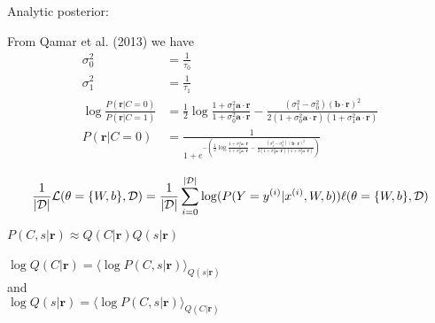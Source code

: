 \documentclass[12pt]{article}
\begin{document}
Analytic posterior:

From Qamar et al. (2013) we have
\begin{equation}
\begin{aligned}
\sigma_0^2 &= \frac{1}{\tau_0}\\
\sigma_1^2 &= \frac{1}{\tau_1}\\
\log \frac{P(\mathbf{r}|C = 0)}{P(\mathbf{r}|C = 1)} &= \frac{1}{2} \log \frac{1 + \sigma_1^2 \mathbf{a} \cdot \mathbf{r}}{1 + \sigma_0^2\mathbf{a} \cdot \mathbf{r}} - \frac{(\sigma_1^2 - \sigma_0^2)(\mathbf{b} \cdot \mathbf{r})^2}{2 (1 + \sigma_0^2 \mathbf{a} \cdot \mathbf{r})(1 + \sigma_1^2 \mathbf{a} \cdot \mathbf{r})}\\
P(\mathbf{r}|C = 0) &= \frac{1}{1 + e^{-(\frac{1}{2} \log \frac{1 + \sigma_1^2 \mathbf{a} \cdot \mathbf{r}}{1 + \sigma_0^2\mathbf{a} \cdot \mathbf{r}} - \frac{(\sigma_1^2 - \sigma_0^2)(\mathbf{b} \cdot \mathbf{r})^2}{2 (1 + \sigma_0^2 \mathbf{a} \cdot \mathbf{r})(1 + \sigma_1^2 \mathbf{a} \cdot \mathbf{r})})}}
\end{aligned}
\end{equation}

\begin{equation}
\frac{1}{|\mathcal{D}|} \mathcal{L} (\theta=\{W,b\}, \mathcal{D}) =
                \frac{1}{|\mathcal{D}|} \sum_{i=0}^{|\mathcal{D}|}
                    \log(P(Y=y^{(i)}|x^{(i)}, W,b)) \\
                \ell (\theta=\{W,b\}, \mathcal{D})
\end{equation}

$P(C, s|\mathbf{r}) \approx Q(C|\mathbf{r}) Q(s|\mathbf{r})$\\
\\
$\log Q(C|\mathbf{r}) = \langle \log P(C, s|\mathbf{r}) \rangle_{Q(s|\mathbf{r})}$\\
and\\
$\log Q(s|\mathbf{r}) = \langle \log P(C, s|\mathbf{r}) \rangle_{Q(C|\mathbf{r})}$\\
\end{document}
